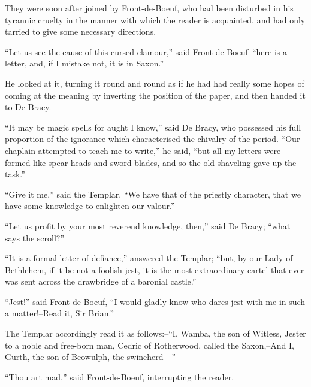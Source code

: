 They were soon after joined by Front-de-Boeuf, who had been disturbed in
his tyrannic cruelty in the manner with which the reader is acquainted,
and had only tarried to give some necessary directions.

``Let us see the cause of this cursed clamour,'' said
Front-de-Boeuf--``here is a letter, and, if I mistake not, it is in
Saxon.''

He looked at it, turning it round and round as if he had had really some
hopes of coming at the meaning by inverting the position of the paper,
and then handed it to De Bracy.

``It may be magic spells for aught I know,'' said De Bracy, who
possessed his full proportion of the ignorance which characterised the
chivalry of the period. ``Our chaplain attempted to teach me to write,''
he said, ``but all my letters were formed like spear-heads and
sword-blades, and so the old shaveling gave up the task.''

``Give it me,'' said the Templar. ``We have that of the priestly
character, that we have some knowledge to enlighten our valour.''

``Let us profit by your most reverend knowledge, then,'' said De Bracy;
``what says the scroll?''

``It is a formal letter of defiance,'' answered the Templar; ``but, by
our Lady of Bethlehem, if it be not a foolish jest, it is the most
extraordinary cartel that ever was sent across the drawbridge of a
baronial castle.''

``Jest!'' said Front-de-Boeuf, ``I would gladly know who dares jest with
me in such a matter!--Read it, Sir Brian.''

The Templar accordingly read it as follows:--``I, Wamba, the son of
Witless, Jester to a noble and free-born man, Cedric of Rotherwood,
called the Saxon,--And I, Gurth, the son of Beowulph, the swineherd---''

``Thou art mad,'' said Front-de-Boeuf, interrupting the reader.

